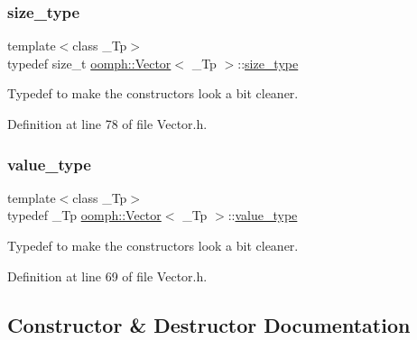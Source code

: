 \mbox{\label{classoomph_1_1Vector_a8ad2a43bd51f6bf2a981dd4e4e4247f5}} 
\subsubsection{\texorpdfstring{size\+\_\+type}{size\_type}}
{\footnotesize\ttfamily template$<$class \+\_\+\+Tp$>$ \\
typedef size\+\_\+t \hyperlink{classoomph_1_1Vector}{oomph\+::\+Vector}$<$ \+\_\+\+Tp $>$\+::\hyperlink{classoomph_1_1Vector_a8ad2a43bd51f6bf2a981dd4e4e4247f5}{size\+\_\+type}}



Typedef to make the constructors look a bit cleaner. 



Definition at line 78 of file Vector.\+h.

\mbox{\label{classoomph_1_1Vector_a73b0fda236ce64119befbeb30111f0b2}} 
\subsubsection{\texorpdfstring{value\+\_\+type}{value\_type}}
{\footnotesize\ttfamily template$<$class \+\_\+\+Tp$>$ \\
typedef \+\_\+\+Tp \hyperlink{classoomph_1_1Vector}{oomph\+::\+Vector}$<$ \+\_\+\+Tp $>$\+::\hyperlink{classoomph_1_1Vector_a73b0fda236ce64119befbeb30111f0b2}{value\+\_\+type}}



Typedef to make the constructors look a bit cleaner. 



Definition at line 69 of file Vector.\+h.



\subsection{Constructor \& Destructor Documentation}
\mbox{\label{classoomph_1_1Vector_a3ee293d1b770f0926ba350250bea37c7}} 

